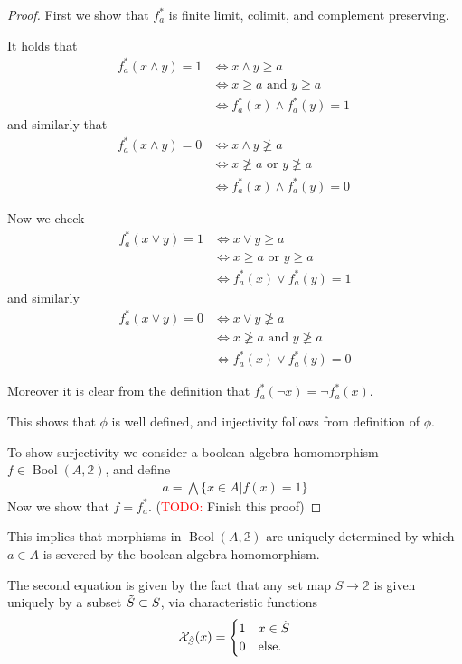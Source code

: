\documentclass[12pt,a4paper]{article}
\DeclareMathOperator{\Bool}{Bool}
\def\t{\ensuremath\tilde}
\begin{document}
  
 
 \begin{proof}
 	First we show that $f^*_a$ is finite limit, colimit, and complement preserving.
 
 It holds that \begin{align*}
 	f^*_a(x \wedge y) = 1 &\iff x \wedge y \geq a\\ &\iff x \geq a \text{ and } y \geq a\\ &\iff f^*_a(x) \wedge f^*_a(y) =1 \
 \end{align*}
 and similarly that \begin{align*}
 	f^*_a(x \wedge y) = 0 &\iff x \wedge y \ngeq a\\ &\iff x \ngeq a \text{ or } y \ngeq a\\ &\iff f^*_a(x)  \wedge f^*_a(y) =0 \
 \end{align*}


Now we check \begin{align*}
	f^*_a( x \vee y) = 1 &\iff x \vee y \geq a\\ &\iff x \geq a \text{ or } y \geq a\\
	&\iff f^*_a(x) \vee f^*_a(y) = 1
\end{align*}
and similarly \begin{align*}
	f^*_a( x \vee y) = 0 &\iff x \vee y \ngeq a\\ &\iff x \ngeq a \text{ and } y \ngeq a\\
	&\iff f^*_a(x) \vee f^*_a(y) = 0
\end{align*}

Moreover it is clear from the definition that $f^*_a(\neg x)  =  \neg f^*_a(x)$.

This shows that $\phi$ is well defined, and injectivity follows from definition of $\phi$. 

To show surjectivity we consider a boolean algebra homomorphism $f \in \Bool(A, \mathbb{2})$, and define \begin{align*}
	a = \bigwedge \{ x \in A \lvert f(x) = 1\}
\end{align*}
Now we show that $ f = f^*_a$. 
(\textcolor{red}{TODO:} Finish this proof)
 \end{proof}
 This implies that morphisms in $\Bool(A, \mathbb{2})$ are uniquely determined by which $a \in A$ is severed by the boolean algebra homomorphism.

The second equation is given by the fact that any set map  $S \to \mathbb{2}$ is given uniquely by a subset $\t S \subset S$, via characteristic functions \begin{equation*}
  \mathcal{X}_{\t S}(x) = \begin{cases}
   1 & x \in \t S \\
    0 & \text{else}.
  \end{cases}
\end{equation*}
\end{document}
